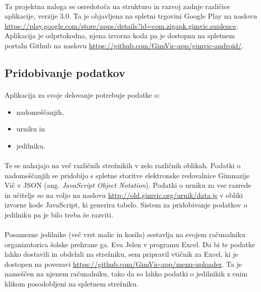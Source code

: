 \paragraph{}Ta projektna naloga se osredotoča na strukturo in razvoj zadnje različice aplikacije, verzije 3.0. Ta je objavljena na spletni trgovini Google Play na naslovu \url{https://play.google.com/store/apps/details?id=com.zigapk.gimvic.suplence}. Aplikacija je odprtokodna, njena izvorna koda pa je dostopna na spletnem portalu Github na naslovu \url{https://github.com/GimVic-app/gimvic-android/}.

\subsection{Pridobivanje podatkov}
\paragraph{}Aplikacija za svoje delovanje potrebuje podatke o:
\begin{itemize}
  \setlength\itemsep{0em}
  \item nadomeščanjih,
  \item urniku in
  \item jedilniku.
\end{itemize}

\paragraph{}Te se nahajajo na več različnih strežnikih v zelo različnih oblikah. Podatki o nadomeščanjih se pridobijo s spletne storitve elektronske redovalnice Gimnazije Vič v JSON\cite{json-wiki} (ang. \textit{JavaScript Object Notation}). Podatki o urniku za vse razrede in učitelje so na voljo na naslovu \url{http://old.gimvic.org/urnik/data.js}\cite{rin} v obliki izvorne kode JavaScript, ki generira tabelo. Sistem za pridobivanje podatkov o jedilniku pa je bilo treba še razviti.

\paragraph{}Posamezne jedilnike (več vrst malic in kosila) sestavlja na svojem računalniku organizatorica šolske prehrane ga. Eva Jelen v programu Excel. Da bi te podatke lahko dostavili in obdelali na strežniku, sem pripravil vtičnik za Excel, ki je dostopen na povezavi \url{https://github.com/GimVic-app/menu-uploader}. Ta je nameščen na njenem računalniku, tako da so lahko podatki o jedilnikih z enim klikom posodobljeni na spletnem strežniku.

